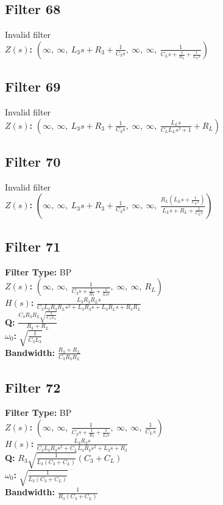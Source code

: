 \documentclass{article}
\begin{document}
\subsection*{Filter 68}
Invalid filter \\ 
\textbf{$Z(s)$:} $\left( \infty, \  \infty, \  L_{3} s + R_{3} + \frac{1}{C_{3} s}, \  \infty, \  \infty, \  \frac{1}{C_{L} s + \frac{1}{R_{L}} + \frac{1}{L_{L} s}}\right)$ \\ 
\subsection*{Filter 69}
Invalid filter \\ 
\textbf{$Z(s)$:} $\left( \infty, \  \infty, \  L_{3} s + R_{3} + \frac{1}{C_{3} s}, \  \infty, \  \infty, \  \frac{L_{L} s}{C_{L} L_{L} s^{2} + 1} + R_{L}\right)$ \\ 
\subsection*{Filter 70}
Invalid filter \\ 
\textbf{$Z(s)$:} $\left( \infty, \  \infty, \  L_{3} s + R_{3} + \frac{1}{C_{3} s}, \  \infty, \  \infty, \  \frac{R_{L} \left(L_{L} s + \frac{1}{C_{L} s}\right)}{L_{L} s + R_{L} + \frac{1}{C_{L} s}}\right)$ \\ 
\subsection*{Filter 71}
\textbf{Filter Type:} BP \\ 
\textbf{$Z(s)$:} $\left( \infty, \  \infty, \  \frac{1}{C_{3} s + \frac{1}{R_{3}} + \frac{1}{L_{3} s}}, \  \infty, \  \infty, \  R_{L}\right)$ \\ 
\textbf{$H(s)$:} $\frac{L_{3} R_{3} R_{L} s}{C_{3} L_{3} R_{3} R_{L} s^{2} + L_{3} R_{3} s + L_{3} R_{L} s + R_{3} R_{L}}$ \\ 
\textbf{Q:} $\frac{C_{3} R_{3} R_{L} \sqrt{\frac{1}{C_{3} L_{3}}}}{R_{3} + R_{L}}$ \\ 
\textbf{$\omega_0$:} $\sqrt{\frac{1}{C_{3} L_{3}}}$ \\ 
\textbf{Bandwidth:} $\frac{R_{3} + R_{L}}{C_{3} R_{3} R_{L}}$ \\ 
\subsection*{Filter 72}
\textbf{Filter Type:} BP \\ 
\textbf{$Z(s)$:} $\left( \infty, \  \infty, \  \frac{1}{C_{3} s + \frac{1}{R_{3}} + \frac{1}{L_{3} s}}, \  \infty, \  \infty, \  \frac{1}{C_{L} s}\right)$ \\ 
\textbf{$H(s)$:} $\frac{L_{3} R_{3} s}{C_{3} L_{3} R_{3} s^{2} + C_{L} L_{3} R_{3} s^{2} + L_{3} s + R_{3}}$ \\ 
\textbf{Q:} $R_{3} \sqrt{\frac{1}{L_{3} \left(C_{3} + C_{L}\right)}} \left(C_{3} + C_{L}\right)$ \\ 
\textbf{$\omega_0$:} $\sqrt{\frac{1}{L_{3} \left(C_{3} + C_{L}\right)}}$ \\ 
\textbf{Bandwidth:} $\frac{1}{R_{3} \left(C_{3} + C_{L}\right)}$ \\ 
\end{document}

